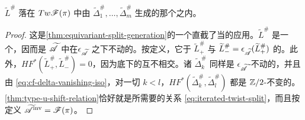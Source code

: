 \begin{proposition}\label{thm:type-u-in-generated-subcategory}
$\widetilde{L}^{\#}$ 落在 $Tw\mathscr{F}(\pi)$ 中由 $\widetilde{\Delta}^{\#}_1,\ldots,\widetilde{\Delta}^{\#}_m$ 生成的那个\trTriangulated\trSubcategory{}之内。
\end{proposition}
\begin{proof}
这是\cref{thm:equivariant-split-generation}的一个直截了当的应用。$\widetilde{L}^{\#}$ 是一个\trEquivariant\trBrane，因而是 $\widetilde{\mathscr{A}}$ 中在\trInvolution{}$\epsilon_{\widetilde{\mathscr{A}}}$ 之下不动的\trObject。按定义，它\trIsomorphic{}于 $\widetilde{L}^{\#}_{+}$ 与 $\widetilde{L}^{\#}_{-}=\epsilon_{\widetilde{\mathscr{A}}}(\widetilde{L}^{\#}_{+})$ 的\trDirectSum。此外，$HF^{*}(\widetilde{L}^{\#}_{+},\widetilde{L}^{\#}_{-})=0$，因为底下的\trLagrange\trSubmanifold{}互不相交。诸 $\widetilde{\Delta}^{\#}_k$ 同样是 $\epsilon_{\widetilde{\mathscr{A}}}$-不动的\trObject，并且由 \eqref{eq:cf-delta-vanishing-iso}，对一切 $k<l$，$HF^{*}(\widetilde{\Delta}^{\#}_k,\widetilde{\Delta}^{\#}_l)$ 都是 $\mathbb{Z}/2$-不变的。\cref{thm:type-u-shift-relation}恰好就是所需要的关系 \eqref{eq:iterated-twist-split}，而且按定义 $\widetilde{\mathscr{A}}^{\mathrm{inv}}=\mathscr{F}(\pi)$。
\end{proof}
